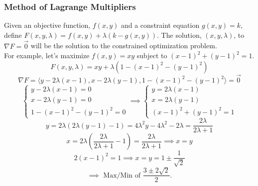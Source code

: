 \subsubsection{Method of Lagrange Multipliers}
\noindent
Given an objective function, $f(x,y)$ and a constraint equation $g(x,y) = k$, define $F(x,y,\lambda) = f(x,y) + \lambda(k-g(x,y))$.
The solution, $(x, y, \lambda)$, to $\nabla F = \vec{0}$ will be the solution to the constrained optimization problem.\\

\noindent
For example, let's maximize $f(x,y)=xy$ subject to $(x-1)^2 + (y-1)^2 = 1$.
\begin{equation*}
	F(x,y,\lambda) = xy + \lambda(1 - (x-1)^2 - (y-1)^2)
\end{equation*}
\begin{equation*}
	\nabla F = \langle y - 2\lambda(x-1), x - 2\lambda(y-1), 1 - (x-1)^2 - (y-1)^2 \rangle = \vec{0}
\end{equation*}
\begin{equation*}
	\begin{cases}
		y - 2\lambda(x-1) = 0 \\ 
		x - 2\lambda(y-1) = 0 \\ 
		1 - (x-1)^2 - (y-1)^2 = 0
	\end{cases}
	\implies \begin{cases}
		y = 2\lambda(x-1) \\ 
		x = 2\lambda(y-1) \\ 
		(x-1)^2 + (y-1)^2 = 1
	\end{cases}
\end{equation*}
\begin{equation*}
	y = 2\lambda(2\lambda(y-1) - 1) = 4\lambda^2 y - 4\lambda^2 - 2\lambda = \frac{2\lambda}{2\lambda+1}
\end{equation*}
\begin{equation*}
	x = 2\lambda\left(\frac{2\lambda}{2\lambda+1} - 1\right) = \frac{2\lambda}{2\lambda+1} \implies x = y
\end{equation*}
\begin{equation*}
	2(x-1)^2 = 1 \implies x = y = 1 \pm \frac{1}{\sqrt{2}}
\end{equation*}
\begin{equation*}
	\implies \text{ Max/Min of } \frac{3 \pm 2\sqrt{2}}{2}.
\end{equation*}